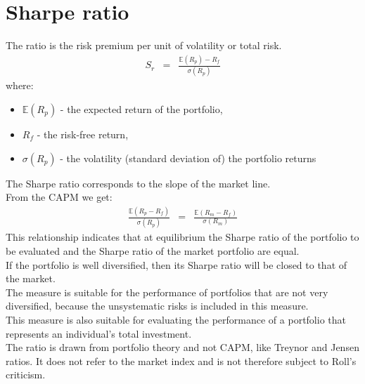 \section{Sharpe ratio}
The ratio is the risk premium per unit of volatility or total risk.
\begin{eqnarray}
	S_{r} &=& \frac{\mathbb{E}(R_{p}) - R_{f}}{\sigma(R_{p})}
\end{eqnarray}
where:
\begin{itemize}
	\item $\mathbb{E}(R_{p})$ - the expected return of the portfolio,
	\item $R_{f}$ - the risk-free return,
	\item $\sigma(R_{p})$ - the volatility (standard deviation of) the portfolio returns
\end{itemize}
The Sharpe ratio corresponds to the slope of the market line.\\
From the CAPM we get:
\begin{eqnarray}
	\frac{\mathbb{E}(R_{p} - R_{f})}{\sigma(R_{p})} &=& \frac{\mathbb{E}(R_{m} - R_{f})}{\sigma(R_{m})}
\end{eqnarray}
This relationship indicates that at equilibrium the Sharpe ratio of the portfolio to be evaluated and the Sharpe ratio of the market portfolio are equal.\\
If the portfolio is well diversified, then its Sharpe ratio will be closed to that of the market.\\
The measure is suitable for the performance of portfolios that are not very diversified, because the unsystematic risks is included in this measure.\\
This measure is also suitable for evaluating the performance of a portfolio that represents an individual's total investment.\\
The ratio is drawn from portfolio theory and not CAPM, like Treynor and Jensen ratios. It does not refer to the market index and is not therefore subject to Roll's criticism.


